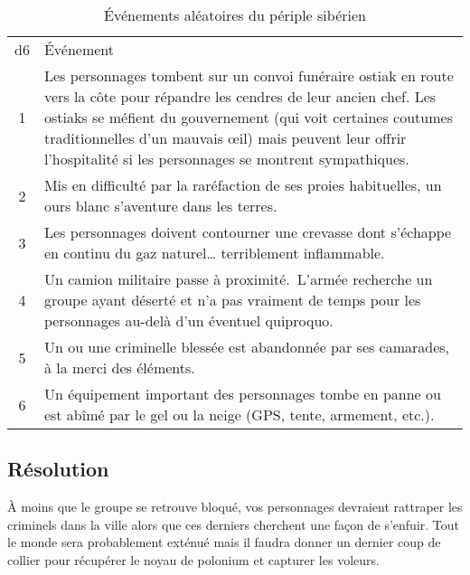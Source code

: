 \begin{table}
	\caption{Événements aléatoires du périple sibérien}
	\label{table:hiver}
	\begin{tabularx}{0.9\textwidth}{cX}
	d6 & Événement\\
	1  & Les personnages tombent sur un convoi funéraire ostiak en route vers la côte pour répandre les cendres de leur ancien chef. Les ostiaks se méfient du gouvernement (qui voit certaines coutumes traditionnelles d'un mauvais œil) mais peuvent leur offrir l'hospitalité si les personnages se montrent sympathiques.\\
	2  & Mis en difficulté par la raréfaction de ses proies habituelles, un ours blanc s'aventure dans les terres.\\
	3  & Les personnages doivent contourner une crevasse dont s'échappe en continu du gaz naturel… terriblement inflammable.\\
	4  & Un camion militaire passe à proximité. L'armée recherche un groupe ayant déserté et n'a pas vraiment de temps pour les personnages au-delà d'un éventuel quiproquo.\\
	5  & Un ou une criminelle blessée est abandonnée par ses camarades, à la merci des éléments.\\
	6  & Un équipement important des personnages tombe en panne ou est abîmé par le gel ou la neige (GPS, tente, armement, etc.).\\
	\end{tabularx}
\end{table}

\subsection{Résolution}

À moins que le groupe se retrouve bloqué, vos personnages devraient rattraper les criminels dans la ville alors que ces derniers cherchent une façon de s'enfuir.
Tout le monde sera probablement exténué mais il faudra donner un dernier coup de collier pour récupérer le noyau de polonium et capturer les voleurs.

\vfill
{}
\vfill
